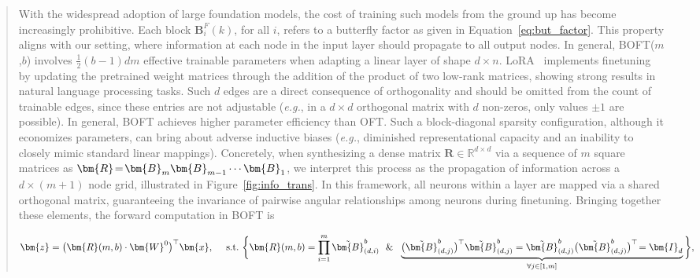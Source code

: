 \begin{abstract}
With the widespread adoption of large foundation models, the cost of training such models from the ground up has become increasingly prohibitive. Each block $\bm{B}^F_i(k)$, for all $i$, refers to a butterfly factor as given in Equation~\ref{eq:but_factor}. This property aligns with our setting, where information at each node in the input layer should propagate to all output nodes. In general, BOFT($m$,$b$) involves $\frac{1}{2}(b-1)dm$ effective trainable parameters when adapting a linear layer of shape $d\times n$. LoRA~\cite{hulora2022} implements finetuning by updating the pretrained weight matrices through the addition of the product of two low-rank matrices, showing strong results in natural language processing tasks. Such $d$ edges are a direct consequence of orthogonality and should be omitted from the count of trainable edges, since these entries are not adjustable (\emph{e.g.}, in a $d \times d$ orthogonal matrix with $d$ non-zeros, only values $\pm 1$ are possible). In general, BOFT achieves higher parameter efficiency than OFT. Such a block-diagonal sparsity configuration, although it economizes parameters, can bring about adverse inductive biases (\emph{e.g.}, diminished representational capacity and an inability to closely mimic standard linear mappings). Concretely, when synthesizing a dense matrix $\bm{R}\in\mathbb{R}^{d\times d}$ via a sequence of $m$ square matrices as $\thickmuskip=2mu \medmuskip=2mu \bm{R}=\bm{B}_m\bm{B}_{m-1}\cdots\bm{B}_1$, we interpret this process as the propagation of information across a $d\times (m+1)$ node grid, illustrated in Figure~\ref{fig:info_trans}. In this framework, all neurons within a layer are mapped via a shared orthogonal matrix, guaranteeing the invariance of pairwise angular relationships among neurons during finetuning. Bringing together these elements, the forward computation in BOFT is

\begin{equation}
    \begin{aligned}\nonumber
    \bm{z}=\big(\bm{R}(m,b)\cdot\bm{W}^0\big)^\top\bm{x},~~~~\text{s.t.}~\bigg{\{}\bm{R}(m,b)=\prod_{i=1}^m \tilde{\bm{B}}^b_{(d,i)}~~\&~~\underbrace{\big(\tilde{\bm{B}}^b_{(d,j)}\big)^\top\tilde{\bm{B}}^b_{(d,j)}=\tilde{\bm{B}}^b_{(d,j)}\big(\tilde{\bm{B}}^b_{(d,j)}\big)^\top\!=\bm{I}_d}_{\forall j\in [1, m]}\bigg{\}},
    \end{aligned}
\end{equation}


\end{abstract}
